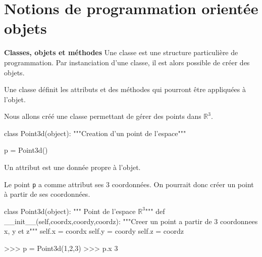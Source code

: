 \documentclass[10pt,fleqn]{article} %
\begin{document}
\section{Notions de programmation orientée objets}
\begin{defi}
\textbf{Classes, objets et méthodes}
Une classe est une structure particulière de programmation. Par instanciation d'une classe, il est alors possible de créer des objets. 

Une classe définit les attributs et des méthodes qui pourront être appliquées à l'objet.
\end{defi}

\begin{exemple}

Nous allons créé une classe permettant de gérer des points dans $\mathbb{R}^3$.

\begin{minipage}[c]{.9\linewidth}
\begin{py}
\begin{python}
class Point3d(object):
	"""Creation d'un point de l'espace"""

p = Point3d()
\end{python}
\end{py}
\end{minipage}
\end{exemple}

\begin{defi}
Un attribut est une donnée propre à l'objet.
\end{defi}

\begin{exemple}

Le point \texttt{p} a comme attribut ses 3 coordonnées. On pourrait donc créer un point à partir de ses coordonnées.

\begin{minipage}[c]{.9\linewidth}
\begin{py}
\begin{python}
class Point3d(object):
    """ Point de l'espace $\mathbb{R}^3$"""
    def __init__(self,coordx,coordy,coordz):
        """Creer un point a partir de 3 coordonnees x, y et z"""
        self.x = coordx
        self.y = coordy
        self.z = coordz

>>> p = Point3d(1,2,3)
>>> p.x
	3
\end{python}
\end{py}
\end{minipage}
\end{exemple}
\end{document}
